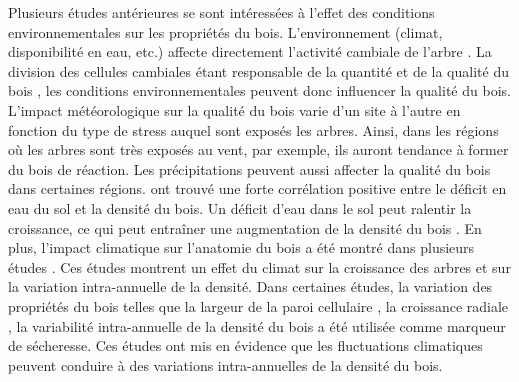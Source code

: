 \documentclass{report}
\begin{document}
Plusieurs études antérieures se sont intéressées à l'effet des conditions environnementales sur les propriétés du bois. L'environnement (climat, disponibilité en eau, etc.) affecte directement l'activité cambiale de l'arbre \citep{FRITTS1976,Kozlowski1997}. La division des cellules cambiales étant responsable de la quantité et de la qualité du bois \citep{Begum2013}, les conditions environnementales peuvent donc influencer la qualité du bois. L'impact météorologique sur la qualité du bois varie d'un site à l'autre en fonction du type de stress auquel sont exposés les arbres. Ainsi, dans les régions où les arbres sont très exposés au vent, par exemple, ils auront tendance à former du bois de réaction. Les précipitations peuvent aussi affecter la qualité du bois dans certaines régions. \cite{Bouriaud2005} ont trouvé une forte corrélation positive entre le déficit en eau du sol et la densité du bois. Un déficit d'eau dans le sol peut ralentir la croissance, ce qui peut entraîner une augmentation de la densité du bois \citep{GARDINER2011}. En plus, l'impact climatique sur l'anatomie du bois a été montré dans plusieurs études \citep{Bouriaud2005,Fritts2001,Campelo2013}. Ces études montrent un effet du climat sur la croissance des arbres et sur la variation intra-annuelle de la densité. Dans certaines études, la variation des propriétés du bois telles que la largeur de la paroi cellulaire \citep{Fritts2001}, la croissance radiale \citep{Jyske2009}, la variabilité intra-annuelle de la densité du bois \citep{Wimmer2000,Rigling2001,Wilkinson2015} a été utilisée comme marqueur de sécheresse. Ces études ont mis en évidence que les fluctuations climatiques peuvent conduire à des variations intra-annuelles de la densité du bois. \\
\end{document}
